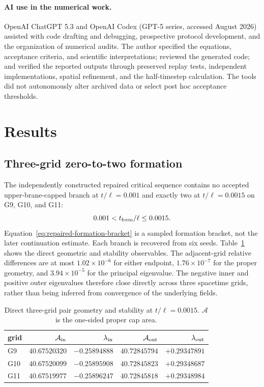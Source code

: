 \documentclass[11pt]{article}
\begin{document}
\paragraph*{AI use in the numerical work.}
OpenAI ChatGPT 5.3 and OpenAI Codex (GPT-5 series, accessed August 2026)
assisted with code drafting and debugging, prospective protocol development,
and the organization of numerical audits.  The author specified the equations,
acceptance criteria, and scientific interpretations; reviewed the generated
code; and verified the reported outputs through preserved replay tests,
independent implementations, spatial refinement, and the half-timestep
calculation.  The tools did not autonomously alter archived data or select
post hoc acceptance thresholds.

\section{Results}

\subsection{Three-grid zero-to-two formation}

The independently constructed repaired critical sequence contains no accepted
upper-brane-capped branch at $t/\ell=0.001$ and exactly two at
$t/\ell=0.0015$ on G9, G10, and G11:
\begin{equation}
0.001<t_{\rm form}/\ell\leq0.0015.
\label{eq:repaired-formation-bracket}
\end{equation}
Equation~\eqref{eq:repaired-formation-bracket} is a sampled formation bracket,
not the later continuation estimate.  Each branch is recovered from six seeds.
Table~\ref{tab:three-grid-formation}
shows the direct geometric and stability observables.  The adjacent-grid
relative differences are at most $1.02\times10^{-6}$ for either endpoint,
$1.76\times10^{-7}$ for the proper geometry, and
$3.94\times10^{-5}$ for the principal eigenvalue.  The negative inner and
positive outer eigenvalues therefore close directly across three spacetime
grids, rather than being inferred from convergence of the underlying fields.

\begin{table}[t]
\centering
\caption{Direct three-grid pair geometry and stability at $t/\ell=0.0015$.
$\mathcal A$ is the one-sided proper cap area.}
\label{tab:three-grid-formation}
\begin{tabular}{@{}lrrrr@{}}
\toprule
grid & $\mathcal A_{\rm in}$ & $\lambda_{\rm in}$ & $\mathcal A_{\rm out}$ & $\lambda_{\rm out}$ \\
\midrule
G9  & $40.67520320$ & $-0.25894888$ & $40.72845794$ & $+0.29347891$ \\
G10 & $40.67520099$ & $-0.25895908$ & $40.72845823$ & $+0.29348687$ \\
G11 & $40.67519977$ & $-0.25896247$ & $40.72845818$ & $+0.29348984$ \\
\bottomrule
\end{tabular}
\end{table}
\end{document}
